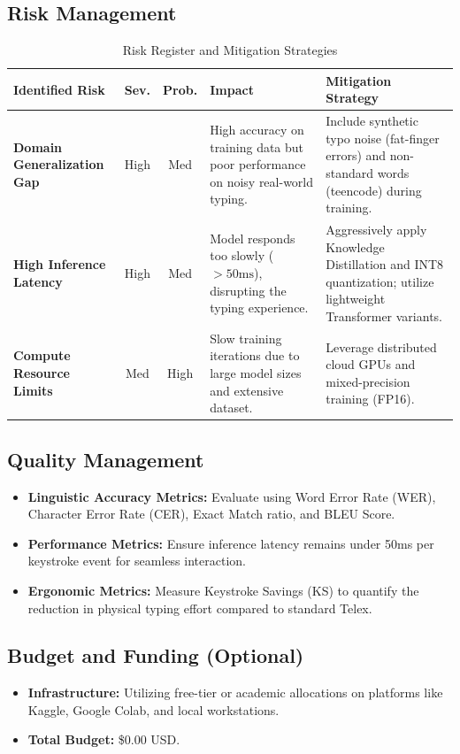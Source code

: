 \subsection{Risk Management}
\begin{table}[H]
\centering
\footnotesize
\renewcommand{\arraystretch}{1.2}
\begin{tabularx}{\textwidth}{|p{2.5cm}|c|c|X|X|}
\hline
\textbf{Identified Risk} & \textbf{Sev.} & \textbf{Prob.} & \textbf{Impact} & \textbf{Mitigation Strategy} \\
\hline
\textbf{Domain Generalization Gap} & High & Med & High accuracy on training data but poor performance on noisy real-world typing. & Include synthetic typo noise (fat-finger errors) and non-standard words (teencode) during training. \\
\hline
\textbf{High Inference Latency} & High & Med & Model responds too slowly ($>50\text{ms}$), disrupting the typing experience. & Aggressively apply Knowledge Distillation and INT8 quantization; utilize lightweight Transformer variants. \\
\hline
\textbf{Compute Resource Limits} & Med & High & Slow training iterations due to large model sizes and extensive dataset. & Leverage distributed cloud GPUs and mixed-precision training (FP16). \\
\hline
\end{tabularx}
\caption{Risk Register and Mitigation Strategies}
\label{tab:risk_register}
\end{table}

\subsection{Quality Management}
\begin{itemize}
    \item \textbf{Linguistic Accuracy Metrics:} Evaluate using Word Error Rate (WER), Character Error Rate (CER), Exact Match ratio, and BLEU Score.
    \item \textbf{Performance Metrics:} Ensure inference latency remains under 50ms per keystroke event for seamless interaction.
    \item \textbf{Ergonomic Metrics:} Measure Keystroke Savings (KS) to quantify the reduction in physical typing effort compared to standard Telex.
\end{itemize}

\subsection{Budget and Funding (Optional)}
\begin{itemize}
    \item \textbf{Infrastructure:} Utilizing free-tier or academic allocations on platforms like Kaggle, Google Colab, and local workstations.
    \item \textbf{Total Budget:} \$0.00 USD.
\end{itemize}

